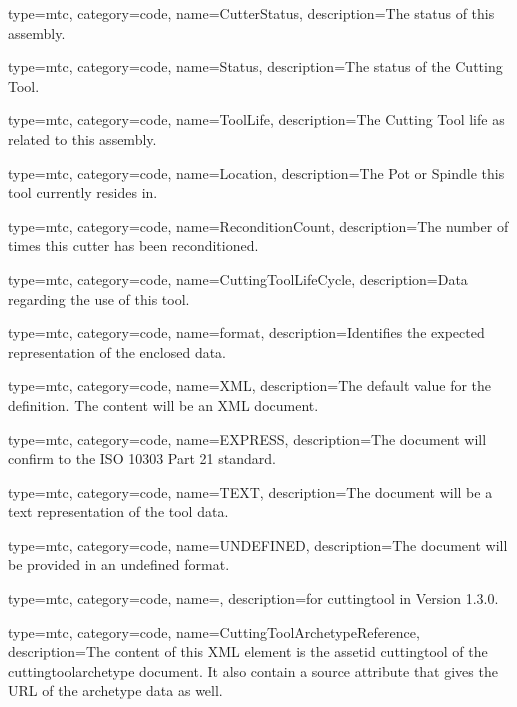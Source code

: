 {
  type=mtc,
  category=code,
  name={CutterStatus},
  description={The status of this assembly.}
}


{
  type=mtc,
  category=code,
  name={Status},
  description={The status of the Cutting Tool.}
}


{
  type=mtc,
  category=code,
  name={ToolLife},
  description={The Cutting Tool life as related to this assembly.}
}


{
  type=mtc,
  category=code,
  name={Location},
  description={The Pot or Spindle this tool currently resides in.}
}


{
  type=mtc,
  category=code,
  name={ReconditionCount},
  description={The number of times this cutter has been reconditioned.}
}


{
  type=mtc,
  category=code,
  name={CuttingToolLifeCycle},
  description={Data regarding the use of this tool.}
}


{
  type=mtc,
  category=code,
  name={format},
  description={Identifies the expected representation of the enclosed data.}
}


{
  type=mtc,
  category=code,
  name={XML},
  description={The default value for the definition. The content will be an XML document.}
}


{
  type=mtc,
  category=code,
  name={EXPRESS},
  description={The document will confirm to the ISO 10303 Part 21 standard.}
}


{
  type=mtc,
  category=code,
  name={TEXT},
  description={The document will be a text representation of the tool data.}
}


{
  type=mtc,
  category=code,
  name={UNDEFINED},
  description={The document will be provided in an undefined format.}
}


{
  type=mtc,
  category=code,
  name=,
  description={\DEPRECATED for \gls{cuttingtool} in Version 1.3.0.   \newline {}}
}


{
  type=mtc,
  category=code,
  name={CuttingToolArchetypeReference},
  description={The content of this XML element is the \gls{assetid cuttingtool} of the \gls{cuttingtoolarchetype} document. It \MAY also contain a source attribute that gives the URL of the archetype data as well.}
}


